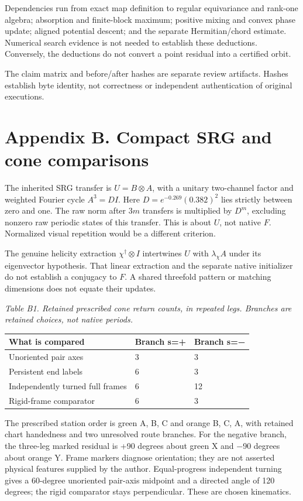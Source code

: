 \documentclass[11pt,a4paper]{article}
\begin{document}
Dependencies run from exact map definition to regular equivariance and rank-one algebra; absorption and finite-block maximum; positive mixing and convex phase update; aligned potential descent; and the separate Hermitian/chord estimate. Numerical search evidence is not needed to establish these deductions. Conversely, the deductions do not convert a point residual into a certified orbit.

The claim matrix and before/after hashes are separate review artifacts. Hashes establish byte identity, not correctness or independent authentication of original executions.

\clearpage
\section*{Appendix B. Compact SRG and cone comparisons}
The inherited SRG transfer is $U=B\otimes A$, with a unitary two-channel factor and weighted Fourier cycle $A^3=D I$. Here $D=e^{-0.269}(0.382)^2$ lies strictly between zero and one. The raw norm after $3m$ transfers is multiplied by $D^m$, excluding nonzero raw periodic states of this transfer. This is about $U$, not native $F$. Normalized visual repetition would be a different criterion. \cite{BRIDGE} \cite{D02}

The genuine helicity extraction $\chi^\dagger\otimes I$ intertwines $U$ with $\lambda_\chi A$ under its eigenvector hypothesis. That linear extraction and the separate native initializer do not establish a conjugacy to $F$. A shared threefold pattern or matching dimensions does not equate their updates.

\par\textit{Table B1. Retained prescribed cone return counts, in repeated legs. Branches are retained choices, not native periods.}
\begingroup\small
\begin{tabularx}{\textwidth}{XXX}
\toprule
What is compared & Branch s=+ & Branch s=−\\\midrule
Unoriented pair axes & 3 & 3\\
Persistent end labels & 6 & 3\\
Independently turned full frames & 6 & 12\\
Rigid-frame comparator & 6 & 3\\
\bottomrule\end{tabularx}\endgroup\par
The prescribed station order is green A, B, C and orange B, C, A, with retained chart handedness and two unresolved route branches. For the negative branch, the three-leg marked residual is +90 degrees about green X and −90 degrees about orange Y. Frame markers diagnose orientation; they are not asserted physical features supplied by the author. Equal-progress independent turning gives a 60-degree unoriented pair-axis midpoint and a directed angle of 120 degrees; the rigid comparator stays perpendicular. These are chosen kinematics. \cite{D01}
\end{document}
